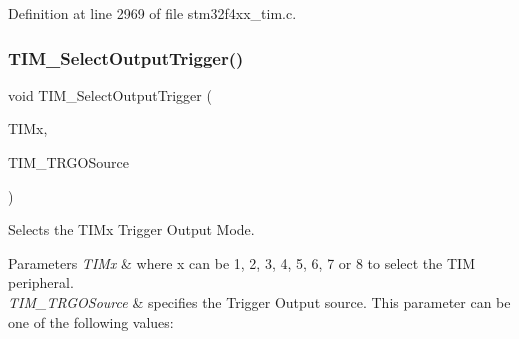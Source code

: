 Definition at line 2969 of file stm32f4xx\+\_\+tim.\+c.

\mbox{\label{group___t_i_m___group7_ga28745aaa549e2067e42c19569209e6c6}} 
\subsubsection{\texorpdfstring{T\+I\+M\+\_\+\+Select\+Output\+Trigger()}{TIM\_SelectOutputTrigger()}}
{\footnotesize\ttfamily void T\+I\+M\+\_\+\+Select\+Output\+Trigger (\begin{DoxyParamCaption}\item[{\hyperlink{struct_t_i_m___type_def}{T\+I\+M\+\_\+\+Type\+Def} $\ast$}]{T\+I\+Mx,  }\item[{uint16\+\_\+t}]{T\+I\+M\+\_\+\+T\+R\+G\+O\+Source }\end{DoxyParamCaption})}



Selects the T\+I\+Mx Trigger Output Mode. 


\begin{DoxyParams}{Parameters}
{\em T\+I\+Mx} & where x can be 1, 2, 3, 4, 5, 6, 7 or 8 to select the T\+IM peripheral.\\
\hline
{\em T\+I\+M\+\_\+\+T\+R\+G\+O\+Source} & specifies the Trigger Output source. This parameter can be one of the following values\+:\\
\hline
\end{DoxyParams}

